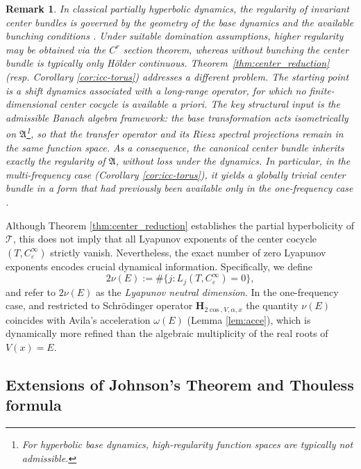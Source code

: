 \documentclass[reqno,11pt]{amsart}
\newtheorem{remark}{Remark}[section]
\begin{document}
\begin{remark}
In classical partially hyperbolic dynamics, the regularity of invariant center bundles is governed by the geometry of the base dynamics and the available bunching conditions \cite{H,HPS}. Under suitable domination assumptions, higher regularity may be obtained via the $C^r$ section theorem, whereas without bunching the center bundle is typically only H\"older continuous.
Theorem~\ref{thm:center_reduction} (resp. Corollary \ref{cor:icc-torus}) addresses a different problem. The starting point is a shift dynamics associated with a long-range operator, for which no finite-dimensional center cocycle is available a priori. The key structural input is the admissible Banach algebra framework: the base transformation acts isometrically on $\mathfrak A$\footnote{For hyperbolic base dynamics, high-regularity function spaces are
typically not admissible.}, so that the transfer operator and its Riesz spectral projections remain in the same function space. As a consequence, the canonical center bundle inherits exactly the regularity of $\mathfrak A$, without loss under the dynamics. In particular, in the multi-frequency case (Corollary \ref{cor:icc-torus}), it yields a globally trivial center bundle in a form that had previously been available only in the one-frequency case \cite{AJS,GJ,LXZ}.
\end{remark}

Although Theorem \ref{thm:center_reduction} establishes the partial hyperbolicity of $\mathscr{T}$, this does not imply that all Lyapunov exponents of the center cocycle $(T, C_{\varepsilon}^{\infty})$ strictly vanish. Nevertheless, the exact number of zero Lyapunov exponents encodes crucial dynamical information. Specifically, we define
\begin{equation}\label{acce}
    2\nu(E) := \#\bigl\{j: L_j(T, C_{\varepsilon}^{\infty}) = 0\bigr\},
\end{equation}
and refer to $2\nu(E)$ as the \emph{Lyapunov neutral dimension}. In the one-frequency case, and restricted to Schr\"odinger operator $\mathbf H_{2\cos,V,\alpha,x}$  the quantity $\nu(E)$ coincides with Avila's acceleration $\omega(E)$ (Lemma \ref{lem:acce}),
which is dynamically more refined than the algebraic multiplicity of the real roots of $V(x)=E.$








\subsection{Extensions of Johnson's Theorem and Thouless formula}
\end{document}
